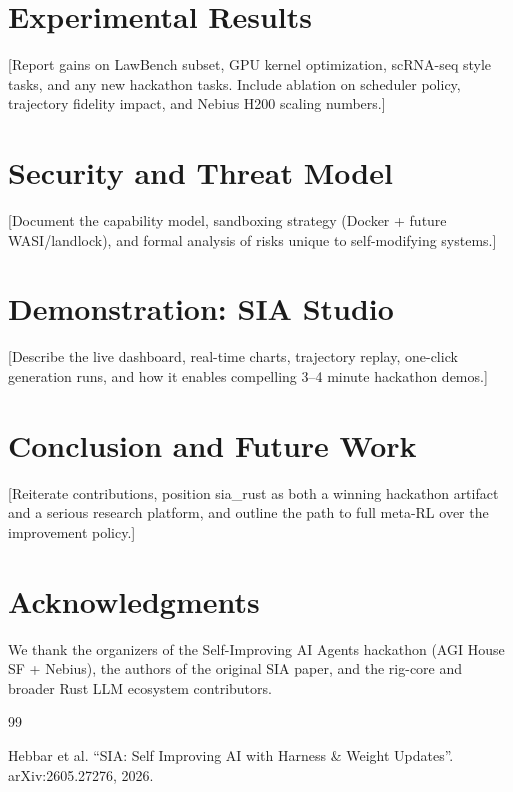 \documentclass{article}
\begin{document}
\section{Experimental Results}

[Report gains on LawBench subset, GPU kernel optimization, scRNA-seq style tasks, and any new hackathon tasks. Include ablation on scheduler policy, trajectory fidelity impact, and Nebius H200 scaling numbers.]

\section{Security and Threat Model}

[Document the capability model, sandboxing strategy (Docker + future WASI/landlock), and formal analysis of risks unique to self-modifying systems.]

\section{Demonstration: SIA Studio}

[Describe the live dashboard, real-time charts, trajectory replay, one-click generation runs, and how it enables compelling 3--4 minute hackathon demos.]

\section{Conclusion and Future Work}

[Reiterate contributions, position sia\_rust as both a winning hackathon artifact and a serious research platform, and outline the path to full meta-RL over the improvement policy.]

\section*{Acknowledgments}

We thank the organizers of the Self-Improving AI Agents hackathon (AGI House SF + Nebius), the authors of the original SIA paper, and the rig-core and broader Rust LLM ecosystem contributors.


\begin{thebibliography}{99}

Hebbar et al. ``SIA: Self Improving AI with Harness \& Weight Updates''. arXiv:2605.27276, 2026.


\end{thebibliography}
\end{document}
